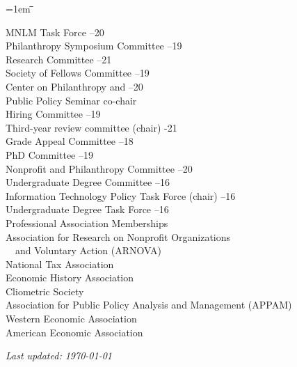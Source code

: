\documentclass[12pt]{article}
\newlength{\midlength}
\newlength{\firstlength}
\newlength{\listindent}
\newlength{\dategap}
\newlength{\wrapgap}
\newenvironment{datetabbing}{
	\begin{tabbing}
	\parskip=1em
	\hspace*{\listindent}\=\hspace*{\firstlength}\=\hspace*{\midlength}\= \kill
}{
	\end{tabbing}
}
\begin{document}
\begin{datetabbing}
\>	\>	MNLM Task Force										--20	\'	\\[\wrapgap]
\>	\>	Philanthropy Symposium Committee						--19	\'	\\[\wrapgap]
\>	\>	Research Committee									--21	\'	\\[\wrapgap]
\>	\>	Society of Fellows Committee							--19	\'	\\[\wrapgap]
\>	\>	Center on Philanthropy and							--20	\'	\\[\wrapgap]
\>	\>  \hspace{1em}Public Policy Seminar co-chair			\>					\'	\\[\wrapgap]
\>	\>	Hiring Committee										--19	\'	\\[\wrapgap]
\>	\>	Third-year review committee (chair)					-21		\'	\\[\wrapgap]
\>	\>	Grade Appeal Committee								--18	\'	\\[\wrapgap]
\>	\>	PhD Committee										--19	\'	\\[\wrapgap]
\>	\>	Nonprofit and Philanthropy Committee					--20	\'	\\[\wrapgap]
\>	\>	Undergraduate Degree Committee						--16	\'	\\[\wrapgap]
\>	\>	Information Technology Policy Task Force (chair)		--16	\'	\\[\wrapgap]
\>	\>	Undergraduate Degree Task Force						--16	\'	\\[\dategap]
\>	Professional Association Memberships												\\[\wrapgap]
\>	\>	Association for Research on Nonprofit Organizations						\>	\\[\wrapgap]
\>	\>	~~and Voluntary Action (ARNOVA)											\>	\\[\wrapgap]
\>	\>	National Tax Association													\>	\\[\wrapgap]
\>	\>	Economic History Association												\>	\\[\wrapgap]
\>	\>	Cliometric Society														\>	\\[\wrapgap]
\>	\>	Association for Public Policy Analysis and Management (APPAM)			\>	\\[\wrapgap]
\>	\>	Western Economic Association												\>	\\[\wrapgap]
\>	\>	American Economic Association											%
\end{datetabbing}

	
\vfill{}
\begin{scriptsize}
\textit{Last updated: \today{} }
\end{scriptsize}
\end{document}
